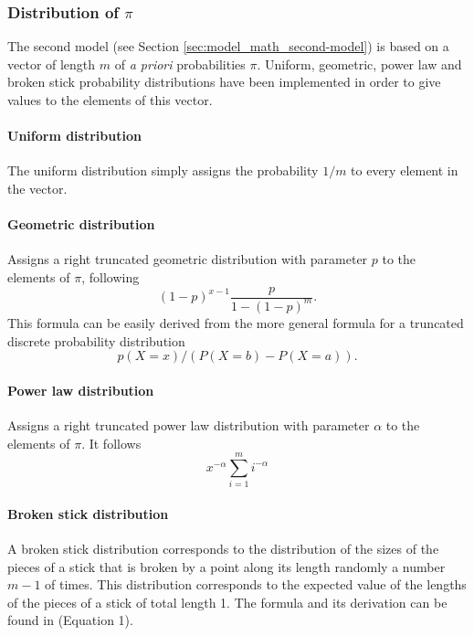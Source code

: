 \subsubsection{Distribution of $\pi$}

The second model (see Section \ref{sec:model_math_second-model}) is based on a vector of length $m$ of \emph{a priori} probabilities $\pi$.
Uniform, geometric, power law and broken stick probability distributions have been implemented in order to give values to the elements of this vector.

\paragraph{Uniform distribution} The uniform distribution simply assigns the probability $1/m$ to every element in the vector.

\paragraph{Geometric distribution} Assigns a right truncated geometric distribution with parameter $p$ to the elements of $\pi$, following
\begin{equation*}
  (1-p)^{x-1} \frac{p}{1 - (1-p)^m}.
\end{equation*}
This formula can be easily derived from the more general formula for a truncated discrete probability distribution
\begin{equation*}
  p(X=x) / (P(X=b) - P(X=a)).
\end{equation*}

\paragraph{Power law distribution} Assigns a right truncated power law distribution with parameter $\alpha$ to the elements of $\pi$.
It follows
\begin{equation*}
  x^{-\alpha} \sum_{i=1}^m i^{-\alpha}
\end{equation*}

\paragraph{Broken stick distribution} A broken stick distribution corresponds to the distribution of the sizes of the pieces of a stick that is broken by a point along its length randomly a number $m-1$ of times.
This distribution corresponds to the expected value of the lengths of the pieces of a stick of total length 1.
The formula and its derivation can be found in \cite{Smart1976a} (Equation 1).

